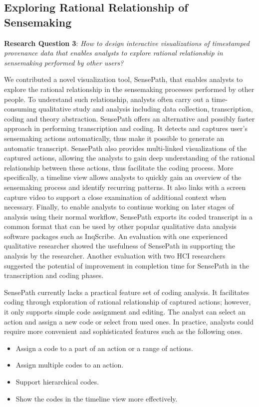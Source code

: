 \subsection{Exploring Rational Relationship of Sensemaking}
\textbf{Research Question 3}: \emph{How to design interactive visualizations of timestamped provenance data that enables analysts to explore rational relationship in sensemaking performed by other users?}

We contributed a novel visualization tool, SensePath, that enables analysts to explore the rational relationship in the sensemaking processes performed by other people. To understand such relationship, analysts often carry out a time-consuming qualitative study and analysis including data collection, transcription, coding and theory abstraction. SensePath offers an alternative and possibly faster approach in performing transcription and coding. It detects and captures user's sensemaking actions automatically, thus make it possible to generate an automatic transcript. SensePath also provides multi-linked visualizations of the captured actions, allowing the analysts to gain deep understanding of the rational relationship between these actions, thus facilitate the coding process. More specifically, a timeline view allows analysts to quickly gain an overview of the sensemaking process and identify recurring patterns. It also links with a screen capture video to support a close examination of additional context when necessary. Finally, to enable analysts to continue working on later stages of analysis using their normal workflow, SensePath exports its coded transcript in a common format that can be used by other popular qualitative data analysis software packages such as InqScribe. An evaluation with one experienced qualitative researcher showed the usefulness of SensePath in supporting the analysis by the researcher. Another evaluation with two HCI researchers suggested the potential of improvement in completion time for SensePath in the transcription and coding phases.

SensePath currently lacks a practical feature set of coding analysis. It facilitates coding through exploration of rational relationship of captured actions; however, it only supports simple code assignment and editing. The analyst can select an action and assign a new code or select from used ones. In practice, analysts could require more convenient and sophisticated features such as the following ones.
	\begin{itemize}
		\item Assign a code to a part of an action or a range of actions.
		\item Assign multiple codes to an action.
		\item Support hierarchical codes.
		\item Show the codes in the timeline view more effectively.
	\end{itemize}
	

